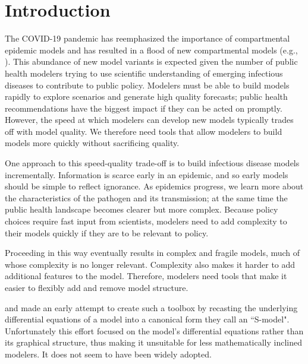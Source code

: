 \section{Introduction}\label{intro}
The COVID-19 pandemic has reemphasized the importance of compartmental epidemic models \citep{abou2020compartmental, massonis2021structural, adam2020special, currie2020simulation, lofgren2014mathematical, mcbryde2020role, enserink2020covid} and has resulted in a flood of new compartmental models (e.g., \cite{friston2020dynamic, fields2021age, chang2022stochastic, lavielle2020extension, balabdaoui2020age, leontitsis2021seahir, LeviEarn22}). 
This abundance of new model variants is expected given the number of public health modelers trying to use scientific understanding of emerging infectious diseases to contribute to public policy. Modelers must be able to build models rapidly to explore scenarios and generate high quality forecasts; public health recommendations have the biggest impact if they can be acted on promptly. However, the speed at which modelers can develop new models typically trades off with model quality. We therefore need tools that allow modelers to build models more quickly without sacrificing quality. 

One approach to this speed-quality trade-off is to build infectious disease models incrementally. Information is scarce early in an epidemic, and so early models should be simple to reflect ignorance. As epidemics progress, we learn more about the characteristics of the pathogen and its transmission; at the same time the public health landscape becomes clearer but more complex. Because policy choices require fast input from scientists, modelers need to add complexity to their models quickly if they are to be relevant to policy. 

Proceeding in this way eventually results in complex and fragile models, much of whose complexity is no longer relevant. Complexity also makes it harder to add additional features to the model. Therefore, modelers need tools that make it easier to flexibly add and remove model structure.

\cite{savageau1988introduction} and \cite{voit1988recasting, voit1990s} made an early attempt to create such a toolbox by recasting the underlying differential equations of a model into a canonical form they call an ``S-model". Unfortunately this effort focused on the model's differential equations rather than its graphical structure, thus making it unsuitable for less mathematically inclined modelers. It does not seem to have been widely adopted.


